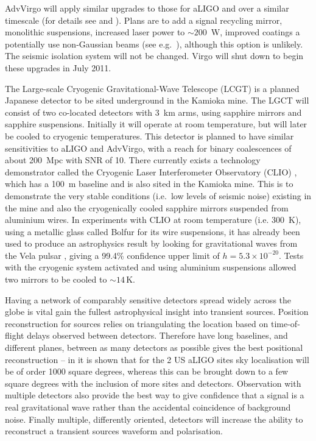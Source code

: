 \documentclass{article}
\begin{document}
AdvVirgo will apply similar upgrades to those for aLIGO and over a similar
timescale (for details see \cite{AdVwhitepaper} and \cite{AdVdesign}). Plans are
to add a signal recycling mirror, monolithic suspensions, increased laser power
to $\sim200$~W, improved coatings a potentially use non-Gaussian beams (see 
e.g.~\cite{Freise:2010}), although this option is unlikely. The seismic isolation
system will not be changed. Virgo will shut down to begin these upgrades in July
2011.

The Large-scale Cryogenic Gravitational-Wave Telescope (LCGT)
\cite{Miyoki:2005, Ohashi:2008} is a planned Japanese detector to be sited
underground in the Kamioka mine. The LGCT will consist of two co-located
detectors with 3~km arms, using sapphire mirrors and sapphire suspensions.
Initially it will operate at room temperature, but will later be cooled to
cryogenic temperatures. This detector is planned to have similar sensitivities
to aLIGO and AdvVirgo, with a reach for binary coalescences of about 200~Mpc
with SNR of 10. There currently exists a technology demonstrator called the
Cryogenic Laser Interferometer Observatory (CLIO) \cite{Yamamoto:2008, CLIOweb},
which has a 100~m baseline and is also sited in the Kamioka mine. This is to
demonstrate the very stable conditions (i.e.\ low levels of seismic noise)
existing in the mine and also the cryogenically cooled sapphire mirrors
suspended from aluminium wires. In experiments with CLIO at room temperature
(i.e. 300~K), using a metallic glass called Bolfur for its wire suspensions, it
has already been used to produce an astrophysics result by looking for
gravitational waves from the Vela pulsar \cite{Akutsu:2008}, giving a 99.4\%
confidence upper limit of $h = 5.3\times10^{-20}$. Tests with the cryogenic
system activated and using aluminium suspensions allowed two mirrors to be
cooled to $\sim14$\,K.

Having a network of comparably sensitive detectors spread widely across the
globe is vital gain the fullest astrophysical insight into transient sources.
Position reconstruction for sources relies on triangulating the location based
on time-of-flight delays observed between detectors. Therefore have long
baselines, and different planes, between as many detectors as possible gives the
best positional reconstruction -- in \cite{Fairhurst:2010} it is shown that for
the 2 US aLIGO sites sky localisation will be of order 1000 square degrees,
whereas this can be brought down to a few square degrees with the inclusion of
more sites and detectors. Observation with multiple detectors also provide the
best way to give confidence that a signal is a real gravitational wave rather
than the accidental coincidence of background noise. Finally multiple,
differently oriented, detectors will increase the ability to reconstruct a
transient sources waveform and polarisation. 
\end{document}
